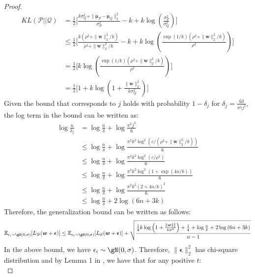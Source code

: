 \documentclass{article} %
\begin{document}
\begin{proof}
\begin{align}
    KL(\mathscr{P}||\mathscr{Q}) &=\frac{1}{2}\bigg[\frac{k\sigma_Q^2+\|\boldsymbol{\mu}_P-\boldsymbol{\mu}_Q\|_2^2}{\sigma_P^2}- k + k\log\left(\frac{\sigma_P^2}{\sigma_Q^2}\right)\bigg]\\
    &\leq \frac{1}{2}\bigg[\frac{k(\rho^2 + \|\boldsymbol{w}\|_2^2/k)}{\rho^2 + \|\boldsymbol{w}\|_2^2/k}- k + k\log\left(\frac{\exp(1/k) \left(\rho^2 + \|\boldsymbol{w}\|_2^2/k\right)}{\rho^2}\right)\bigg]\\
    &=\frac{1}{2}\bigg[k\log\left(\frac{\exp(1/k) \left(\rho^2 + \|\boldsymbol{w}\|_2^2/k\right)}{\rho^2}\right)\bigg]\\    
    &= \frac{1}{2}\bigg[1+k\log\left(1+\frac{\|\boldsymbol{w}\|_2^2}{k\sigma_Q^2}\right)\bigg]
\end{align}
Given the bound that corresponds to $j$ holds with probability $1-\delta_j$ for $\delta_j=\frac{6\delta}{\pi^2j^2}$, the log term in the bound can be written as:
\begin{align*}
    \log\frac{n}{\delta_j} &= \log\frac{n}{\delta} + \log\frac{\pi^2j^2}{6}\\
    &\leq \log\frac{n}{\delta} + \log\frac{\pi^2k^2\log^2(c/(\rho^2 + \|\boldsymbol{w}\|_2^2/k))}{6}\\
    &\leq \log\frac{n}{\delta} + \log\frac{\pi^2k^2\log^2(c/\rho^2)}{6}\\
    &\leq \log\frac{n}{\delta} + \log\frac{\pi^2k^2\log^2(1+\exp(4n/k))}{6}\\
    &\leq \log\frac{n}{\delta} + \log\frac{\pi^2k^2(2 +4n/k)^2}{6}\\
    &\leq \log \frac{n}{\delta} + 2 \log\left(6n + 3 k\right)
\end{align*}
Therefore, the generalization bound can be written as follows:
\begin{equation}\label{eq:almost_theorem}
    \mathbb{E}_{\epsilon_i \sim \gN(0,\sigma)}[L_\mathscr{D}(\boldsymbol{w}+\boldsymbol{\epsilon})] \leq \mathbb{E}_{\epsilon_i \sim \gN(0,\sigma)}[L_\mathcal{S}(\boldsymbol{w}+\boldsymbol{\epsilon})] +\sqrt{\frac{\frac{1}{4}k\log\left(1+\frac{\|\boldsymbol{w}\|_2^2}{k\sigma^2}\right) + \frac{1}{4}+\log \frac{n}{\delta} + 2\log\left(6n + 3k\right)}{n-1}}
\end{equation}
In the above bound, we have $\epsilon_i \sim \gN(0,\sigma)$. Therefore, $\|\boldsymbol{\epsilon}\|_2^2$ has chi-square distribution and by Lemma 1 in \cite{laurent2000adaptive}, we have that for any positive $t$:
\begin{equation}

\end{equation}
\end{proof}
\end{document}
